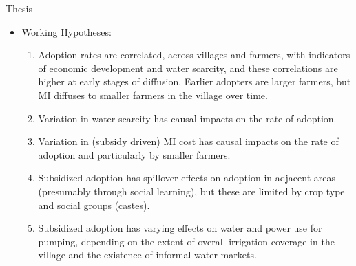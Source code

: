 \documentclass[10pt]{beamer}
\begin{document}
\begin{frame}
	{Thesis}
	\begin{itemize}
		\item Working Hypotheses:
		      \begin{enumerate}
			      \item Adoption rates are correlated, across villages and farmers, with indicators of economic development and water scarcity, and these correlations are higher at early stages of diffusion. Earlier adopters are larger farmers, but MI diffuses to smaller farmers in the village over time.
			      \item Variation in water scarcity has causal impacts on the rate of adoption.
			      \item Variation in (subsidy driven) MI cost has causal impacts on the rate of adoption and particularly by smaller farmers.
			      \item Subsidized adoption has spillover effects on adoption in adjacent areas (presumably through social learning), but these are limited by crop type and social groups (castes).
			      \item Subsidized adoption has varying effects on water and power use for pumping, depending on the extent of overall irrigation coverage in the village and the existence of informal water markets.
		      \end{enumerate}
	\end{itemize}
\end{frame}


\end{document}
